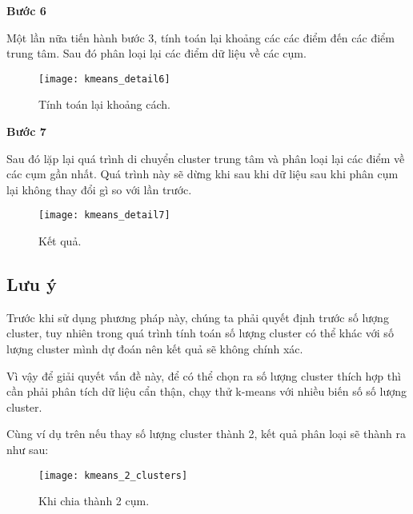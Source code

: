 \newline
\textbf{Bước 6}
\par
Một lần nữa tiến hành bước 3, tính toán lại khoảng các các điểm đến các điểm trung tâm. Sau đó phân loại lại các điểm dữ liệu về các cụm.
\begin{figure}[!htbp]
    \centering
    \texttt{[image: kmeans\_detail6]}
    \caption{Tính toán lại khoảng cách.}
    \label{fig:x cubed graph}
\end{figure}
\FloatBarrier
\textbf{Bước 7}
\par
Sau đó lặp lại quá trình di chuyển cluster trung tâm và phân loại lại các điểm về các cụm gần nhất.
Quá trình này sẽ dừng khi sau khi dữ liệu sau khi phân cụm lại không thay đổi gì so với lần trước.
\begin{figure}[!htbp]
    \centering
    \texttt{[image: kmeans\_detail7]}
    \caption{Kết quả.}
    \label{fig:x cubed graph}
\end{figure}
\FloatBarrier
\subsection{Lưu ý}
Trước khi sử dụng phương pháp này, chúng ta phải quyết định trước số lượng cluster, tuy nhiên trong quá trình tính toán số lượng cluster có thể khác với số lượng cluster mình dự đoán nên kết quả sẽ không chính xác.
\par
Vì vậy để giải quyết vấn đề này, để có thể chọn ra số lượng cluster thích hợp thì cần phải phân tích dữ liệu cẩn thận, chạy thử k-means với nhiều biến số số lượng cluster.
\par
Cùng ví dụ trên nếu thay số lượng cluster thành 2, kết quả phân loại sẽ thành ra như sau:
\begin{figure}[!htbp]
    \centering
    \texttt{[image: kmeans\_2\_clusters]}
    \caption{Khi chia thành 2 cụm.}
    \label{fig:x cubed graph}
\end{figure}
\FloatBarrier